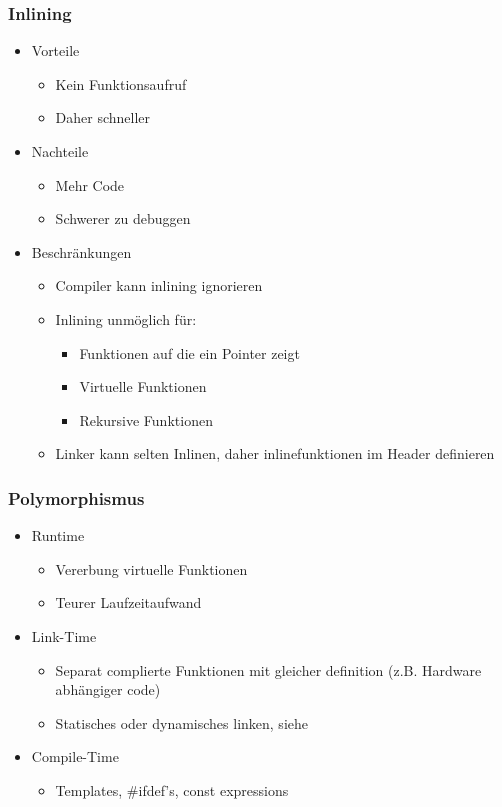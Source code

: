 \subsubsection{Inlining}
\begin{itemize}
	\item Vorteile
		\begin{itemize}
			\item Kein Funktionsaufruf
			\item Daher schneller
		\end{itemize}
	\item Nachteile
		\begin{itemize}
			\item Mehr Code
			\item Schwerer zu debuggen
		\end{itemize}
	\item Beschränkungen
		\begin{itemize}
			\item Compiler kann inlining ignorieren
			\item Inlining unmöglich für:
				\begin{itemize}
					\item Funktionen auf die ein Pointer zeigt
					\item Virtuelle Funktionen
					\item Rekursive Funktionen
				\end{itemize}
			\item Linker kann selten Inlinen, daher inlinefunktionen im Header definieren
		\end{itemize}
\end{itemize}

\subsubsection{Polymorphismus}
\begin{itemize}
	\item Runtime
		\begin{itemize}
			\item Vererbung virtuelle Funktionen
			\item Teurer Laufzeitaufwand
		\end{itemize}
	\item Link-Time
		\begin{itemize}
			\item Separat complierte Funktionen mit gleicher definition (z.B.
				Hardware abhängiger code)
			\item Statisches oder dynamisches linken, siehe 
		\end{itemize}
	\item Compile-Time
		\begin{itemize}
			\item Templates, \#ifdef's, const expressions
		\end{itemize}
\end{itemize}

